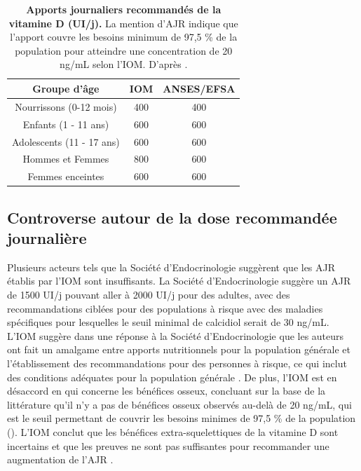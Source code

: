 \documentclass[
  a4paper,
  DIV=11,
  numbers=noendperiod,
  listof=totoc]{scrreprt}
\begin{document}
\begin{table}
\centering
\caption[Apports journaliers recommandés de la vitamine D (UI/j)]{\textbf{Apports journaliers recommandés de la vitamine D (UI/j).} La mention d'\ac{AJR} indique que l'apport couvre les besoins minimum de 97,5 \% de la population pour atteindre une concentration de 20 ng/mL selon l'\ac{IOM}. D'après \textcite{ANSES.2021, IOM.2011}.}
\label{tbl-AJR}
\begin{tabular}{ccc}
\toprule
\textbf{Groupe d'âge} & \textbf{IOM} & \textbf{ANSES/EFSA} \\
\midrule
Nourrissons (0-12 mois) & 400 & 400 \\
Enfants (1 - 11 ans) & 600 & 600 \\
Adolescents (11 - 17 ans) & 600 & 600 \\
Hommes et Femmes & 800 & 600 \\
Femmes enceintes & 600 & 600 \\
\bottomrule
\end{tabular}
\end{table}

\subsection{Controverse autour de la dose recommandée
journalière}\label{controverse-autour-de-la-dose-recommanduxe9e-journaliuxe8re}

Plusieurs acteurs tels que la Société d'Endocrinologie suggèrent que les
\ac{AJR} établis par l'\ac{IOM} sont insuffisants. La Société
d'Endocrinologie suggère un \ac{AJR} de 1500 UI/j pouvant aller à 2000
UI/j pour des adultes, avec des recommandations ciblées pour des
populations à risque avec des maladies spécifiques pour lesquelles le
seuil minimal de calcidiol serait de 30 ng/mL. L'\ac{IOM} suggère dans
une réponse à la Société d'Endocrinologie que les auteurs ont fait un
amalgame entre apports nutritionnels pour la population générale et
l'établissement des recommandations pour des personnes à risque, ce qui
inclut des conditions adéquates pour la population générale
\autocite{Rosen.IOM.2012}. De plus, l'\ac{IOM} est en désaccord en qui
concerne les bénéfices osseux, concluant sur la base de la littérature
qu'il n'y a pas de bénéfices osseux observés au-delà de 20 ng/mL, qui
est le seuil permettant de couvrir les besoins minimes de 97,5 \% de la
population (). L'\ac{IOM} conclut que les bénéfices
extra-squelettiques de la vitamine D sont incertains et que les preuves
ne sont pas suffisantes pour recommander une augmentation de l'\ac{AJR}
\autocite{IOM.2011}.
\end{document}
